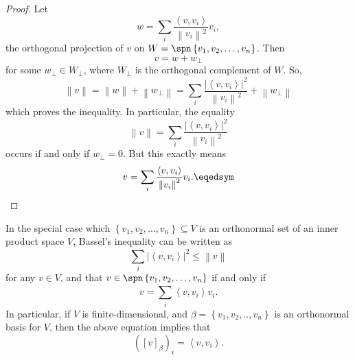 \documentclass[linearalgebraII]{subfiles}
\begin{document}
    \begin{proof}
        Let
        \begin{equation*}
            w = \sum^{}_{i} \frac{\left\langle v, v_i\right\rangle }{\left\lVert v_i\right\rVert ^2}v_i,
        \end{equation*}
        the orthogonal projection of $v$ on $W = \spn\left\lbrace v_1,v_2,\ldots,v_n \right\rbrace$. Then
        \begin{equation*}
            v = w + w_\perp
        \end{equation*}
        for some $w_\perp\in W_\perp$, where $W_\perp$ is the orthogonal complement of $W$. So,
        \begin{equation*}
            \left\lVert v\right\rVert = \left\lVert w\right\rVert + \left\lVert w_\perp\right\rVert = \sum^{}_{i} \frac{\left| \left\langle v, v_i\right\rangle  \right| ^2}{\left\lVert v_i\right\rVert ^2} + \left\lVert w_\perp\right\rVert 
        \end{equation*}
        which proves the inequality. In particular, the equality
        \begin{equation*}
            \left\lVert v\right\rVert = \sum^{}_{i} \frac{\left| \left\langle v, v_i\right\rangle  \right| ^2}{\left\lVert v_i\right\rVert ^2}
        \end{equation*}
        occurs if and only if $w_\perp = 0$. But this exactly means
        \begin{equation*}
            v = \sum^{}_{i} \frac{\left\langle v, v_i\right\rangle }{\left\lVert v_i\right\rVert ^2}v_i. \eqedsym
        \end{equation*}
    \end{proof}

    \begin{remark}
        In the special case which $\left\lbrace v_1,v_2,\ldots,v_n \right\rbrace\subseteq V$ is an orthonormal set of an inner product space $V$, Bassel's inequality can be written as
        \begin{equation*}
            \sum^{}_{i} \left| \left\langle v, v_i\right\rangle  \right| ^2\leq \left\lVert v\right\rVert 
        \end{equation*}
        for any $v\in V$, and that $v\in\spn\left\lbrace v_1,v_2,\ldots,v_n \right\rbrace $ if and only if
        \begin{equation*}
            v = \sum^{}_{i} \left\langle v, v_i\right\rangle v_i.
        \end{equation*}
        In particular, if $V$ is finite-dimensional, and $\beta = \left\lbrace v_1,v_2,..,v_n \right\rbrace$ is an orthonormal basis for $V$, then the above equation implies that
        \begin{equation*}
            \left( \left[ v \right] _\beta \right) _i = \left\langle v, v_i\right\rangle .
        \end{equation*}
    \end{remark}
\end{document}
